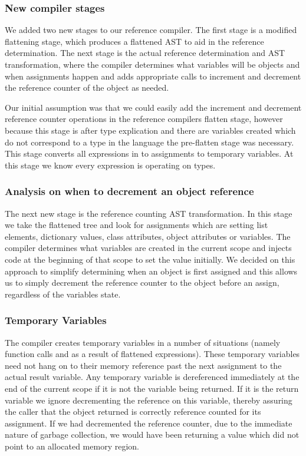 \documentclass{sigplanconf}
\begin{document}
\subsubsection{New compiler stages}
We added two new stages to our reference compiler.  The first stage is a modified flattening stage, which produces a flattened AST to aid in the reference determination.  The next stage is the actual reference determination and AST transformation, where the compiler determines what variables will be objects and when assignments happen and adds appropriate calls to increment and decrement the reference counter of the object as needed.
\par
Our initial assumption was that we could easily add the increment and decrement reference counter operations in the reference compilers flatten stage, however because this stage is after type explication and there are variables created which do not correspond to a type in the language the pre-flatten stage was necessary.  This stage converts all expressions in to assignments to temporary variables.  At this stage we know every expression is operating on types.

\subsubsection{Analysis on when to decrement an object reference}
The next new stage is the reference counting AST transformation.  In this stage we take the flattened tree and look for assignments which are setting list elements, dictionary values, class attributes, object attributes or variables.  The compiler determines what variables are created in the current scope and injects code at the beginning of that scope to set the value initially.  We decided on this approach to simplify determining when an object is first assigned and this allows us to simply decrement the reference counter to the object before an assign, regardless of the variables state.

\subsubsection{Temporary Variables}
The compiler creates temporary variables in a number of situations (namely function calls and as a result of flattened expressions).  These temporary variables need not hang on to their memory reference past the next assignment to the actual result variable.  Any temporary variable is dereferenced immediately at the end of the current scope if it is not the variable being returned.  If it is the return variable we ignore decrementing the reference on this variable, thereby assuring the caller that the object returned is correctly reference counted for its assignment.  If we had decremented the reference counter, due to the immediate nature of garbage collection, we would have been returning a value which did not point to an allocated memory region.
\end{document}
